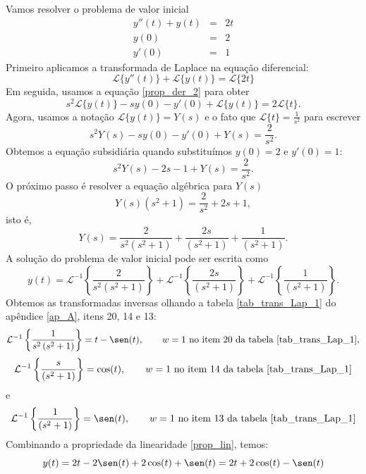 \begin{ex}Vamos resolver o problema de valor inicial
\begin{eqnarray*}
 y''(t)+y(t)&=&2t\\
y(0)&=&2\\
y'(0)&=&1
\end{eqnarray*}
Primeiro aplicamos a transformada de Laplace na equação diferencial:
  \begin{equation}
 \mathcal{L}\{y''(t)\}+\mathcal{L}\{y(t)\}=\mathcal{L}\{2t\}
 \end{equation}
 Em seguida, usamos a equação \ref{prop_der_2} para obter
  \begin{equation}
s^2 \mathcal{L }\{ y(t)\}-sy(0)-y'(0)+\mathcal{L}\{y(t)\}=2\mathcal{L}\{t\}.
 \end{equation}
 Agora, usamos a notação $\mathcal{L }\{ y(t)\}=Y(s)$ e o fato que $\mathcal{L}\{t\}=\frac{1}{s^2}$ para escrever
  \begin{equation}
s^2 Y(s)-sy(0)-y'(0)+Y(s)=\frac{2}{s^2}.
 \end{equation}
 Obtemos a equação subsidiária quando substituímos $y(0)=2$ e $y'(0)=1$:
  \begin{equation}
s^2 Y(s)-2s-1+Y(s)=\frac{2}{s^2}.
 \end{equation}
 O próximo passo é resolver a equação algébrica para $Y(s)$
  \begin{equation}
 Y(s)\left(s^2+1\right)=\frac{2}{s^2}+2s+1,
 \end{equation}
 isto é,
  \begin{equation}
 Y(s)=\frac{2}{s^2\left(s^2+1\right)}+\frac{2s}{\left(s^2+1\right)}+\frac{1}{\left(s^2+1\right)}.
 \end{equation}
 A solução do problema de valor inicial pode ser escrita como
 \begin{equation}
y(t)=\mathcal{L}^{-1}\left\{\frac{2}{s^2\left(s^2+1\right)}\right\}+\mathcal{L}^{-1}\left\{\frac{2s}{\left(s^2+1\right)}\right\}+\mathcal{L}^{-1}\left\{\frac{1}{\left(s^2+1\right)}\right\}.
\end{equation}
 Obtemos as transformadas inversas olhando a tabela \ref{tab_trans_Lap_1} do apêndice \ref{ap_A}, itens 20, 14 e 13:
  \begin{equation}
 \mathcal{L}^{-1}\left\{\frac{1}{s^2\left(s^2+1\right)}\right\}=t-\sen(t),\qquad w=1\ \hbox{no item 20 da tabela \ref{tab_trans_Lap_1}}, \end{equation}
  \begin{equation}
 \mathcal{L}^{-1}\left\{\frac{s}{\left(s^2+1\right)}\right\}=\cos(t),\qquad w=1\ \hbox{no item 14 da tabela \ref{tab_trans_Lap_1}}
 \end{equation}
 e
  \begin{equation}
 \mathcal{L}^{-1}\left\{\frac{1}{\left(s^2+1\right)}\right\}=\sen(t),\qquad w=1\ \hbox{no item 13 da tabela \ref{tab_trans_Lap_1}}
 \end{equation}
 Combinando a propriedade da linearidade \ref{prop_lin}, temos:
  \begin{equation}
y(t)=2t-2\sen(t)+2\cos(t)+\sen(t)=2t+2\cos(t)-\sen(t)
\end{equation}
 \end{ex}
